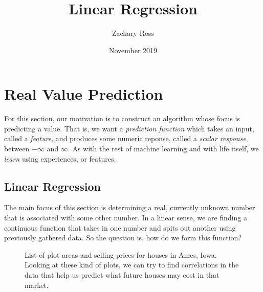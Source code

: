 \documentclass{book}[a5paper]
\title{Linear Regression}
\author{Zachary Ross}
\date{November 2019}
\begin{document}
\section{Real Value Prediction}

For this section, our motivation is to construct an algorithm whose focus is
predicting a value. That is, we want a \emph{prediction function} which takes an
input, called a \emph{feature}, and produces some numeric reponse, called a
\emph{scalar response}, between $-\infty$ and $\infty$. As with the rest of
machine learning and with life itself, we \emph{learn} using experiences, or
features.


\subsection{Linear Regression}


The main focus of this section is determining a real, currently unknown number
that is associated with some other number. In a linear sense, we are finding
a continuous function that takes in one number and spits out another using
previously gathered data. So the question is, how do we form this function?


\begin{figure}[t!]
    \label{fig:hp}
    \caption{List of plot areas and selling prices for houses in Ames, Iowa.
    Looking at these kind of plots, we can try to find correlations in the data
    that help us predict what future houses may cost in that market.}
\end{figure}
\end{document}
